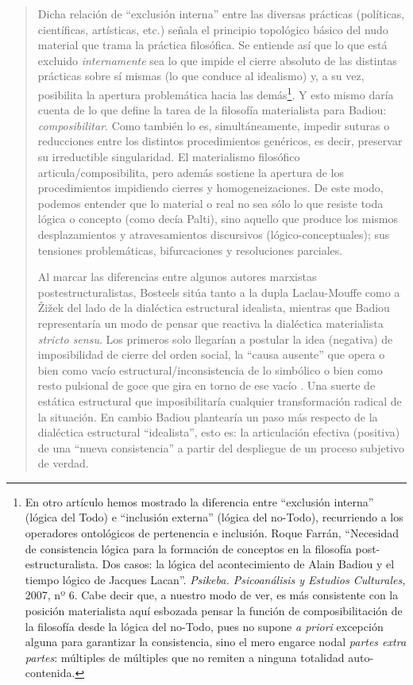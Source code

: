 \begin{quote}
Dicha relación de \enquote{exclusión interna} entre las diversas prácticas (políticas, científicas, artísticas, etc.) señala el principio topológico básico del nudo material que trama la práctica filosófica. Se entiende así que lo que está excluido \emph{internamente} sea lo que impide el cierre absoluto de las distintas prácticas sobre sí mismas (lo que conduce al idealismo) y, a su vez, posibilita la apertura problemática hacia las demás\footnote{En otro artículo hemos mostrado la diferencia entre \enquote{exclusión interna} (lógica del Todo) e \enquote{inclusión externa} (lógica del no-Todo), recurriendo a los operadores ontológicos de pertenencia e inclusión. Roque Farrán, \enquote{Necesidad de consistencia lógica para la formación de conceptos en la filosofía post-estructuralista. Dos casos: la lógica del acontecimiento de Alain Badiou y el tiempo lógico de Jacques Lacan}. \emph{Psikeba. Psicoanálisis y Estudios Culturales,} 2007, nº 6. Cabe decir que, a nuestro modo de ver, es más consistente con la posición materialista aquí esbozada pensar la función de composibilitación de la filosofía desde la lógica del no-Todo, pues no supone \emph{a priori} excepción alguna para garantizar la consistencia, sino el mero engarce nodal \emph{partes extra partes}: múltiples de múltiples que no remiten a ninguna totalidad auto-contenida.}. Y esto mismo daría cuenta de lo que define la tarea de la filosofía materialista para Badiou: \emph{composibilitar}. Como también lo es, simultáneamente, impedir suturas o reducciones entre los distintos procedimientos genéricos, es decir, preservar su irreductible singularidad. El materialismo filosófico articula/composibilita, pero además sostiene la apertura de los procedimientos impidiendo cierres y homogeneizaciones. De este modo, podemos entender que lo material o real no sea sólo lo que resiste toda lógica o concepto (como decía Palti), sino aquello que produce los mismos desplazamientos y atravesamientos discursivos (lógico-conceptuales); sus tensiones problemáticas, bifurcaciones y resoluciones parciales.

Al marcar las diferencias entre algunos autores marxistas postestructuralistas, Bosteels sitúa tanto a la dupla Laclau-Mouffe como a Žižek del lado de la dialéctica estructural idealista, mientras que Badiou representaría un modo de pensar que reactiva la dialéctica materialista \emph{stricto sensu}. Los primeros solo llegarían a postular la idea (negativa) de imposibilidad de cierre del orden social, la \enquote{causa ausente} que opera o bien como vacío estructural/inconsistencia de lo simbólico  o bien como resto pulsional de goce que gira en torno de ese vacío . Una suerte de estática estructural que imposibilitaría cualquier transformación radical de la situación. En cambio Badiou plantearía un paso más respecto de la dialéctica estructural \enquote{idealista}, esto es: la articulación efectiva (positiva) de una \enquote{nueva consistencia} a partir del despliegue de un proceso subjetivo de verdad.


\end{quote}
